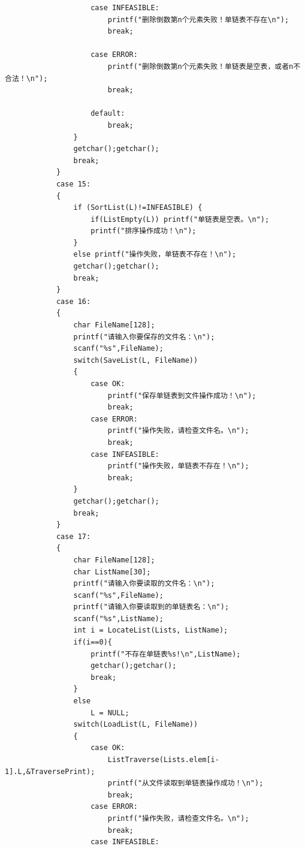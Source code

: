 \documentclass[supercite]{Experimental_Report}
\theoremstyle{definition}
\begin{document}
\begin{lstlisting}
                    case INFEASIBLE:
                        printf("删除倒数第n个元素失败！单链表不存在\n");
                        break;
                        
                    case ERROR:
                        printf("删除倒数第n个元素失败！单链表是空表，或者n不合法！\n");
                        break;
                        
                    default:
                        break;
                }
                getchar();getchar();
                break;
            }
            case 15:
            {
                if (SortList(L)!=INFEASIBLE) {
                    if(ListEmpty(L)) printf("单链表是空表。\n");
                    printf("排序操作成功！\n");
                }
                else printf("操作失败，单链表不存在！\n");
                getchar();getchar();
                break;
            }
            case 16:
            {
                char FileName[128];
                printf("请输入你要保存的文件名：\n");
                scanf("%s",FileName);
                switch(SaveList(L, FileName))
                {
                    case OK:
                        printf("保存单链表到文件操作成功！\n");
                        break;
                    case ERROR:
                        printf("操作失败，请检查文件名。\n");
                        break;
                    case INFEASIBLE:
                        printf("操作失败，单链表不存在！\n");
                        break;
                }
                getchar();getchar();
                break;
            }
            case 17:
            {
                char FileName[128];
                char ListName[30];
                printf("请输入你要读取的文件名：\n");
                scanf("%s",FileName);
                printf("请输入你要读取到的单链表名：\n");
                scanf("%s",ListName);
                int i = LocateList(Lists, ListName);
                if(i==0){
                    printf("不存在单链表%s!\n",ListName);
                    getchar();getchar();
                    break;
                }
                else
                    L = NULL;
                switch(LoadList(L, FileName))
                {
                    case OK:
                        ListTraverse(Lists.elem[i-1].L,&TraversePrint);
                        printf("从文件读取到单链表操作成功！\n");
                        break;
                    case ERROR:
                        printf("操作失败，请检查文件名。\n");
                        break;
                    case INFEASIBLE:

\end{lstlisting}
\end{document}
